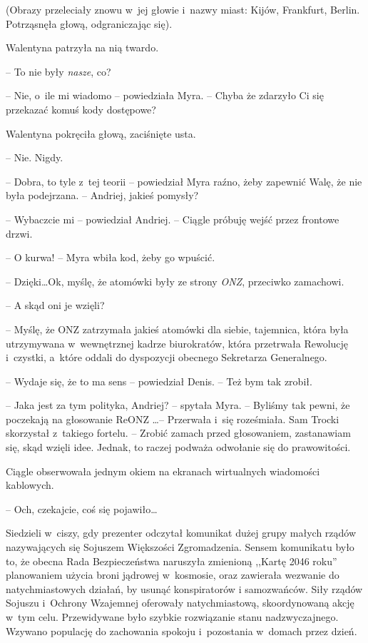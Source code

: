 \documentclass[oneside,polish,11pt,sfheadings]{mwbk}
\begin{document}
(Obrazy przeleciały znowu w~jej głowie i~nazwy miast: Kijów, Frankfurt,
Berlin. Potrząsnęła głową, odgraniczając się).

Walentyna patrzyła na nią twardo. 

-- To nie były \textit{nasze}, co?

-- Nie, o~ile mi wiadomo -- powiedziała Myra. -- Chyba że zdarzyło Ci się
przekazać komuś kody dostępowe?

Walentyna pokręciła głową, zaciśnięte usta. 

-- Nie. Nigdy.

-- Dobra, to tyle z~tej teorii -- powiedział Myra raźno, żeby zapewnić
Walę, że nie była podejrzana. -- Andriej, jakieś pomysły?

-- Wybaczcie mi -- powiedział Andriej. -- Ciągle próbuję wejść przez
frontowe drzwi.

-- O kurwa! -- Myra wbiła kod, żeby go wpuścić.

-- Dzięki\ldots Ok, myślę, że atomówki były ze strony \textit{ONZ}, przeciwko
zamachowi.

-- A skąd oni je wzięli?

-- Myślę, że ONZ zatrzymała jakieś atomówki dla siebie, tajemnica, która
była utrzymywana w~wewnętrznej kadrze biurokratów, która przetrwała
Rewolucję i~czystki, a~które oddali do dyspozycji obecnego Sekretarza
Generalnego.

-- Wydaje się, że to ma sens -- powiedział Denis. -- Też bym tak zrobił.

-- Jaka jest za tym polityka, Andriej? -- spytała Myra. -- Byliśmy tak
pewni, że poczekają na głosowanie ReONZ \ldots -- Przerwała i~się roześmiała.
Sam Trocki skorzystał z~takiego fortelu. -- Zrobić zamach przed
głosowaniem, zastanawiam się, skąd wzięli idee. Jednak, to raczej
podważa odwołanie się do prawowitości.

Ciągle obserwowała jednym okiem na ekranach wirtualnych wiadomości
kablowych. 

-- Och, czekajcie, coś się pojawiło\ldots

Siedzieli w~ciszy, gdy prezenter odczytał komunikat dużej grupy małych
rządów nazywających się Sojuszem Większości Zgromadzenia. Sensem
komunikatu było to, że obecna Rada Bezpieczeństwa naruszyła zmienioną
,,Kartę 2046 roku'' planowaniem użycia broni jądrowej w~kosmosie, oraz
zawierała wezwanie do natychmiastowych działań, by usunąć konspiratorów
i samozwańców. Siły rządów Sojuszu i~Ochrony Wzajemnej oferowały
natychmiastową, skoordynowaną akcję w~tym celu. Przewidywane było
szybkie rozwiązanie stanu nadzwyczajnego. Wzywano populację do
zachowania spokoju i~pozostania w~domach przez dzień.
\end{document}
